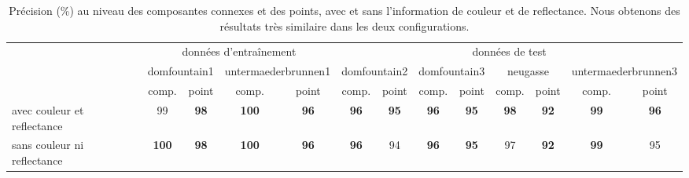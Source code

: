 \begin{table}[p]
\tiny
\begin{tabular}{l|c|c|c|c|c|c|c|c|c|c|c|c|}
\cline{2-13}
                                                  & \multicolumn{4}{c|}{données d'entraînement}                                  & \multicolumn{8}{c|}{données de test}                                                                                                             \\ \cline{2-13} 
                                                  & \multicolumn{2}{c|}{domfountain1} & \multicolumn{2}{c|}{untermaederbrunnen1} & \multicolumn{2}{c|}{domfountain2} & \multicolumn{2}{c|}{domfountain3} & \multicolumn{2}{c|}{neugasse} & \multicolumn{2}{c|}{untermaederbrunnen3} \\ \cline{2-13} 
                                                  & comp.            & point          & comp.               & point              & comp.           & point           & comp.           & point           & comp.         & point         & comp.               & point              \\ \hline
\multicolumn{1}{|l|}{avec couleur et reflectance} & 99               & \textbf{98}    & \textbf{100}        & \textbf{96}        & \textbf{96}     & \textbf{95}     & \textbf{96}     & \textbf{95}     & \textbf{98}   & \textbf{92}   & \textbf{99}         & \textbf{96}        \\ \hline
\multicolumn{1}{|l|}{sans couleur ni reflectance} & \textbf{100}     & \textbf{98}    & \textbf{100}        & \textbf{96}        & \textbf{96}     & 94              & \textbf{96}     & \textbf{95}     & 97            & \textbf{92}   & \textbf{99}         & 95                 \\ \hline
\end{tabular}
\caption{Précision (\%) au niveau des composantes connexes et des points, avec et sans l'information de couleur et de reflectance. Nous obtenons des résultats très similaire dans les deux configurations.}
\label{table:laser_color}
\end{table}